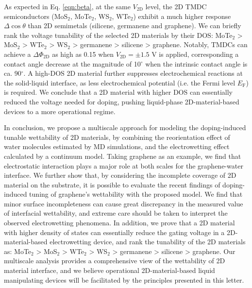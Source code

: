 \documentclass[aps,prl,reprint,groupedaddress,amsmath,amssymb, showpacs]{revtex4-1}
\begin{document}
As expected in Eq. \ref{eqn:beta}, at the same \(V_{\mathrm{2D}}\) level,
the 2D TMDC semiconductors (MoS\(_{\text{2}}\), MoTe\(_{\text{2}}\), WS\(_{\text{2}}\), WTe\(_{\text{2}}\)) exhibit a much
higher response \(\Delta \cos \theta\) than 2D semimetals (silicene,
germanene and graphene). We can briefly rank the voltage tunability of
the selected 2D materials by their DOS: MoTe\(_{\text{2}}\) > MoS\(_{\text{2}}\) > WTe\(_{\text{2}}\) > WS\(_{\text{2}}\)
> germanene > silicene > graphene. Notably, TMDCs can achieve a
\(\Delta \Phi_{\mathrm{2D}}\) as high as 0.15 when
\(V_{\mathrm{2D}}=\pm1.5\) V is applied, corresponding a contact angle
decrease at the magnitude of 10\(^{\circ}\) when the intrinsic contact
angle is ca. 90\(^{\circ}\).  A high-DOS 2D material further suppresses
electrochemical reactions at the solid-liquid interface, as less
electrochemical potential (i.e. the Fermi level \(E_{\mathrm{F}}\)) is
required. We conclude that a 2D material with higher DOS can
essentially reduced the voltage needed for doping, pushing
liquid-phase 2D-material-based devices to a more operational regime.


In conclusion, we propose a multiscale approach for modeling the
doping-induced tunable wettability of 2D materials, by combining the
reorientation effect of water molecules estimated by MD simulations,
and the electrowetting effect calculated by a continuum model. Taking
graphene as an example, we find that electrostatic interaction plays a
major role at both scales for the graphene-water interface. We further
show that, by considering the incomplete coverage of 2D material on
the substrate, it is possible to evaluate the recent findings of
doping-induced tuning of graphene's wettability with the proposed
model. We find that minor surface incompleteness can cause great
discrepancy in the measured value of interfacial wettability, and
extreme care should be taken to interpret the observed
electrowetting phenomena. In addition, we prove that a 2D material
with higher density of states can essentially reduce the gating
voltage in a 2D-material-based electrowetting device, and rank the
tunability of the 2D materials as: MoTe\(_{\text{2}}\) > MoS\(_{\text{2}}\) > WTe\(_{\text{2}}\) > WS\(_{\text{2}}\) >
germanene > silicene > graphene. Our multiscale analysis provides a
comprehensive view of the wettability of 2D material interface, and we
believe operational 2D-material-based liquid manipulating devices will
be facilitated by the principles presented in this letter.

\end{document}
